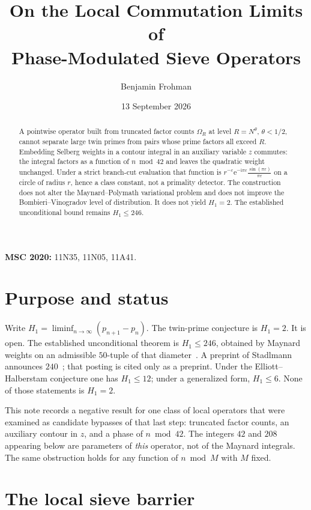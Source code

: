 \documentclass[11pt,a4paper]{article}
\title{On the Local Commutation Limits of\\ Phase-Modulated Sieve Operators}
\author{Benjamin Frohman}
\date{13 September 2026}
\theoremstyle{plain}
\theoremstyle{remark}
\begin{document}
\maketitle

\begin{abstract}
A pointwise operator built from truncated factor counts \(\Omega_R\) at level \(R=N^\theta\), \(\theta<1/2\), cannot separate large twin primes from pairs whose prime factors all exceed \(R\). Embedding Selberg weights in a contour integral in an auxiliary variable \(z\) commutes: the integral factors as a function of \(n\bmod 42\) and leaves the quadratic weight unchanged. Under a strict branch-cut evaluation that function is \(r^{-\varepsilon}\mathrm{e}^{-\mathrm{i}\pi\varepsilon}\frac{\sin(\pi\varepsilon)}{\pi\varepsilon}\) on a circle of radius \(r\), hence a class constant, not a primality detector. The construction does not alter the Maynard--Polymath variational problem and does not improve the Bombieri--Vinogradov level of distribution. It does not yield \(H_1=2\). The established unconditional bound remains \(H_1\le 246\).
\end{abstract}

\noindent\textbf{MSC 2020:} 11N35, 11N05, 11A41.

\section{Purpose and status}

Write \(H_1=\liminf_{n\to\infty}(p_{n+1}-p_n)\). The twin-prime conjecture is \(H_1=2\). It is open. The established unconditional theorem is \(H_1\le 246\), obtained by Maynard weights on an admissible \(50\)-tuple of that diameter~\cite{Polymath8b}. A preprint of Stadlmann announces \(240\)~\cite{Stadlmann240}; that posting is cited only as a preprint. Under the Elliott--Halberstam conjecture one has \(H_1\le 12\); under a generalized form, \(H_1\le 6\). None of those statements is \(H_1=2\).

This note records a negative result for one class of local operators that were examined as candidate bypasses of that last step: truncated factor counts, an auxiliary contour in \(z\), and a phase of \(n\bmod 42\). The integers \(42\) and \(208\) appearing below are parameters of \emph{this} operator, not of the Maynard integrals. The same obstruction holds for any function of \(n\bmod M\) with \(M\) fixed.

\section{The local sieve barrier}
\end{document}
